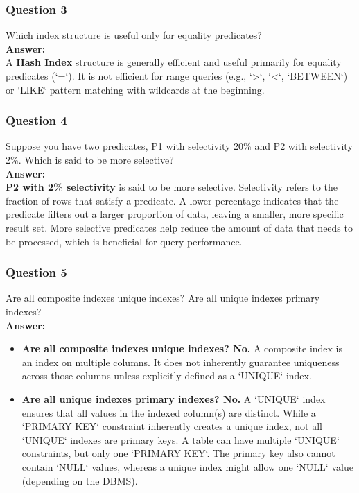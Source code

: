 \documentclass{article}
\begin{document}
\subsubsection*{Question 3}

Which index structure is useful only for equality predicates?\\

\textbf{Answer:}\\

A \textbf{Hash Index} structure is generally efficient and useful primarily for equality predicates (`=`). It is not efficient for range queries (e.g., `>`, `<`, `BETWEEN`) or `LIKE` pattern matching with wildcards at the beginning.\\

\subsubsection*{Question 4}

Suppose you have two predicates, P1 with selectivity 20\% and P2 with selectivity 2\%. Which is said to be more selective?\\

\textbf{Answer:}\\

\textbf{P2 with 2\% selectivity} is said to be more selective. Selectivity refers to the fraction of rows that satisfy a predicate. A lower percentage indicates that the predicate filters out a larger proportion of data, leaving a smaller, more specific result set. More selective predicates help reduce the amount of data that needs to be processed, which is beneficial for query performance.\\

\subsubsection*{Question 5}

Are all composite indexes unique indexes? Are all unique indexes primary indexes?\\

\textbf{Answer:}\\

\begin{itemize}
    \item \textbf{Are all composite indexes unique indexes? No.} A composite index is an index on multiple columns. It does not inherently guarantee uniqueness across those columns unless explicitly defined as a `UNIQUE` index.
    \item \textbf{Are all unique indexes primary indexes? No.} A `UNIQUE` index ensures that all values in the indexed column(s) are distinct. While a `PRIMARY KEY` constraint inherently creates a unique index, not all `UNIQUE` indexes are primary keys. A table can have multiple `UNIQUE` constraints, but only one `PRIMARY KEY`. The primary key also cannot contain `NULL` values, whereas a unique index might allow one `NULL` value (depending on the DBMS).
\end{itemize}
\end{document}
